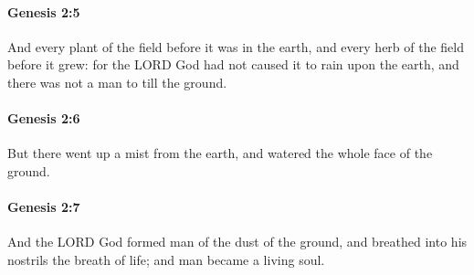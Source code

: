		\paragraph{Genesis 2:5} %
			\label{GENESIS-2-5}

			And every plant of the field before it was in the earth, and every herb of the field before it grew: for the LORD God had not caused it to rain upon the earth, and there was not a man to till the ground.


		\paragraph{Genesis 2:6} %
			\label{GENESIS-2-6}

			But there went up a mist from the earth, and watered the whole face of the ground.


		\paragraph{Genesis 2:7} %
			\label{GENESIS-2-7}

			And the LORD God formed man of the dust of the ground, and breathed into his nostrils the breath of life; and man became a living soul.


